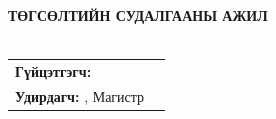 \begin{center}
	\vspace*{65mm}
	
	{\doublespacing\MakeUppercase{
		\textbf{Төгсөлтийн судалгааны ажил} \\
		\textbf{\Large \titlename} \\
	}}
	\par
	\vspace{35mm}
	\begin{tabular}{l l}
		\textbf{Гүйцэтгэгч:}\authorShort \\
		\textbf{Удирдагч:} \supervisorname, Магистр\\
		
	\end{tabular}
	\vspace*{\fill}
\end{center}
\begin{center}
	\cityname \\
	\gradYear
\end{center}